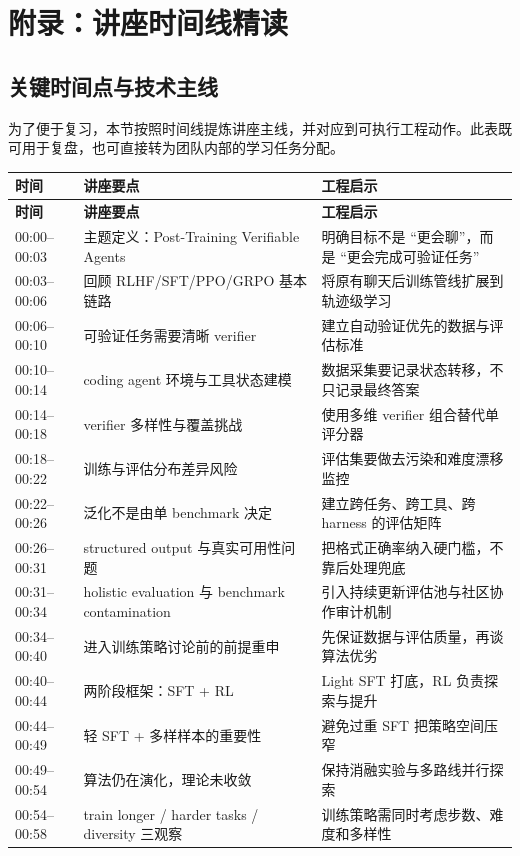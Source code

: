 \section{附录：讲座时间线精读}

\subsection{关键时间点与技术主线}
为了便于复习，本节按照时间线提炼讲座主线，并对应到可执行工程动作。此表既可用于复盘，也可直接转为团队内部的学习任务分配。

\begin{longtable}{p{1.8cm}p{3.8cm}p{5.4cm}}
\toprule
\textbf{时间} & \textbf{讲座要点} & \textbf{工程启示} \\
\midrule
\endfirsthead
\toprule
\textbf{时间} & \textbf{讲座要点} & \textbf{工程启示} \\
\midrule
\endhead
00:00--00:03 & 主题定义：Post-Training Verifiable Agents & 明确目标不是 ``更会聊''，而是 ``更会完成可验证任务'' \\
00:03--00:06 & 回顾 RLHF/SFT/PPO/GRPO 基本链路 & 将原有聊天后训练管线扩展到轨迹级学习 \\
00:06--00:10 & 可验证任务需要清晰 verifier & 建立自动验证优先的数据与评估标准 \\
00:10--00:14 & coding agent 环境与工具状态建模 & 数据采集要记录状态转移，不只记录最终答案 \\
00:14--00:18 & verifier 多样性与覆盖挑战 & 使用多维 verifier 组合替代单评分器 \\
00:18--00:22 & 训练与评估分布差异风险 & 评估集要做去污染和难度漂移监控 \\
00:22--00:26 & 泛化不是由单 benchmark 决定 & 建立跨任务、跨工具、跨 harness 的评估矩阵 \\
00:26--00:31 & structured output 与真实可用性问题 & 把格式正确率纳入硬门槛，不靠后处理兜底 \\
00:31--00:34 & holistic evaluation 与 benchmark contamination & 引入持续更新评估池与社区协作审计机制 \\
00:34--00:40 & 进入训练策略讨论前的前提重申 & 先保证数据与评估质量，再谈算法优劣 \\
00:40--00:44 & 两阶段框架：SFT + RL & Light SFT 打底，RL 负责探索与提升 \\
00:44--00:49 & 轻 SFT + 多样样本的重要性 & 避免过重 SFT 把策略空间压窄 \\
00:49--00:54 & 算法仍在演化，理论未收敛 & 保持消融实验与多路线并行探索 \\
00:54--00:58 & train longer / harder tasks / diversity 三观察 & 训练策略需同时考虑步数、难度和多样性 \\

\end{longtable}
